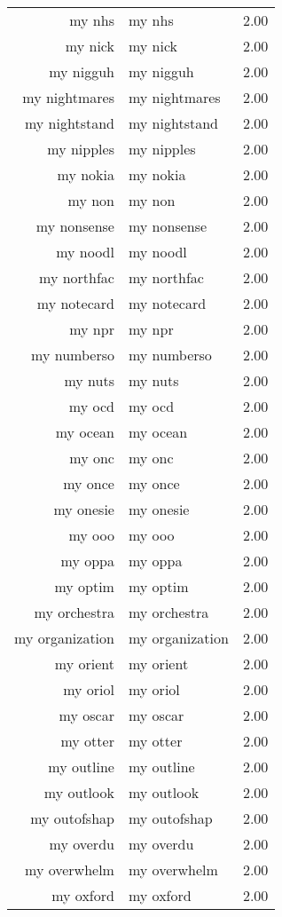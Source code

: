 \begin{table}[ht]
\begin{tabular}{rlr}
  my nhs & my nhs & 2.00 \\ 
  my nick & my nick & 2.00 \\ 
  my nigguh & my nigguh & 2.00 \\ 
  my nightmares & my nightmares & 2.00 \\ 
  my nightstand & my nightstand & 2.00 \\ 
  my nipples & my nipples & 2.00 \\ 
  my nokia & my nokia & 2.00 \\ 
  my non & my non & 2.00 \\ 
  my nonsense & my nonsense & 2.00 \\ 
  my noodl & my noodl & 2.00 \\ 
  my northfac & my northfac & 2.00 \\ 
  my notecard & my notecard & 2.00 \\ 
  my npr & my npr & 2.00 \\ 
  my numberso & my numberso & 2.00 \\ 
  my nuts & my nuts & 2.00 \\ 
  my ocd & my ocd & 2.00 \\ 
  my ocean & my ocean & 2.00 \\ 
  my onc & my onc & 2.00 \\ 
  my once & my once & 2.00 \\ 
  my onesie & my onesie & 2.00 \\ 
  my ooo & my ooo & 2.00 \\ 
  my oppa & my oppa & 2.00 \\ 
  my optim & my optim & 2.00 \\ 
  my orchestra & my orchestra & 2.00 \\ 
  my organization & my organization & 2.00 \\ 
  my orient & my orient & 2.00 \\ 
  my oriol & my oriol & 2.00 \\ 
  my oscar & my oscar & 2.00 \\ 
  my otter & my otter & 2.00 \\ 
  my outline & my outline & 2.00 \\ 
  my outlook & my outlook & 2.00 \\ 
  my outofshap & my outofshap & 2.00 \\ 
  my overdu & my overdu & 2.00 \\ 
  my overwhelm & my overwhelm & 2.00 \\ 
  my oxford & my oxford & 2.00 \\ 

\end{tabular}
\end{table}
